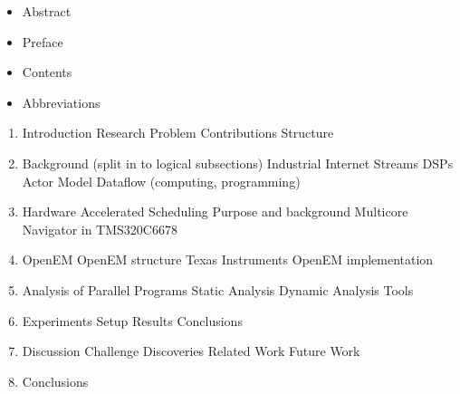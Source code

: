\begin{itemize}
\item Abstract
\item Preface
\item Contents
\item Abbreviations
\end{itemize}

\begin{enumerate}
\item Introduction
  \subitem Research Problem
  \subitem Contributions
  \subitem Structure

\item Background (split in to logical subsections)
  \subitem Industrial Internet
  \subitem Streams
  \subitem DSPs
  \subitem Actor Model
  \subitem Dataflow (computing, programming)

\item Hardware Accelerated Scheduling
  \subitem Purpose and background
  \subitem Multicore Navigator in TMS320C6678

\item OpenEM
  \subitem OpenEM structure
  \subitem Texas Instruments OpenEM implementation

\item Analysis of Parallel Programs
  \subitem Static Analysis
  \subitem Dynamic Analysis
  \subitem Tools

\item Experiments
  \subitem Setup
  \subitem Results
  \subitem Conclusions

\item Discussion
  \subitem Challenge
  \subitem Discoveries
  \subitem Related Work
  \subitem Future Work
\item Conclusions
\end{enumerate}